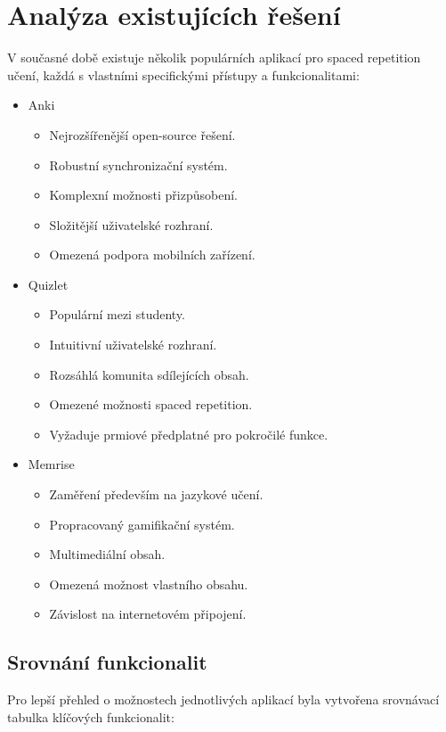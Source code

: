 \documentclass[12pt, a4paper, oneside]{report}
\begin{document}
	\section{Analýza existujících řešení}
	V současné době existuje několik populárních aplikací pro spaced repetition učení, každá s vlastními specifickými přístupy a funkcionalitami:

	\begin{itemize}
		\item Anki
		\begin{itemize}
			\item Nejrozšířenější open-source řešení.
			\item Robustní synchronizační systém.
			\item Komplexní možnosti přizpůsobení.
			\item Složitější uživatelské rozhraní.
			\item Omezená podpora mobilních zařízení.
		\end{itemize}

		\item Quizlet
		\begin{itemize}
			\item Populární mezi studenty.
			\item Intuitivní uživatelské rozhraní.
			\item Rozsáhlá komunita sdílejících obsah.
			\item Omezené možnosti spaced repetition.
			\item Vyžaduje prmiové předplatné pro pokročilé funkce.
		\end{itemize}

		\item Memrise
		\begin{itemize}
			\item Zaměření především na jazykové učení.
			\item Propracovaný gamifikační systém.
			\item Multimediální obsah.
			\item Omezená možnost vlastního obsahu.
			\item Závislost na internetovém připojení.
		\end{itemize}
	\end{itemize}

	\subsection{Srovnání funkcionalit}
	Pro lepší přehled o možnostech jednotlivých aplikací byla vytvořena srovnávací tabulka klíčových funkcionalit:
\end{document}
